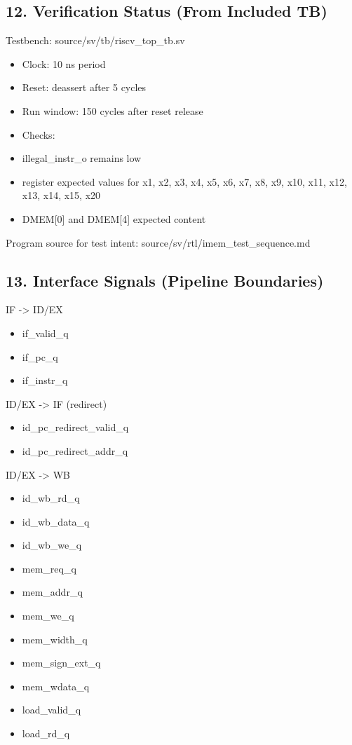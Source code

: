 \documentclass[]{article}
\providecommand{\tightlist}{%
  \setlength{\itemsep}{0pt}\setlength{\parskip}{0pt}}
\begin{document}
\hypertarget{12-verification-status-from-included-tb}{%
\subsection{12. Verification Status (From Included
TB)}\label{12-verification-status-from-included-tb}}

Testbench: source/sv/tb/riscv\_top\_tb.sv

\begin{itemize}
\tightlist
\item
  Clock: 10 ns period
\item
  Reset: deassert after 5 cycles
\item
  Run window: 150 cycles after reset release
\item
  Checks:
\item
  illegal\_instr\_o remains low
\item
  register expected values for x1, x2, x3, x4, x5, x6, x7, x8, x9, x10,
  x11, x12, x13, x14, x15, x20
\item
  DMEM{[}0{]} and DMEM{[}4{]} expected content
\end{itemize}

Program source for test intent: source/sv/rtl/imem\_test\_sequence.md

\hypertarget{13-interface-signals-pipeline-boundaries}{%
\subsection{13. Interface Signals (Pipeline
Boundaries)}\label{13-interface-signals-pipeline-boundaries}}

IF -\textgreater{} ID/EX

\begin{itemize}
\tightlist
\item
  if\_valid\_q
\item
  if\_pc\_q
\item
  if\_instr\_q
\end{itemize}

ID/EX -\textgreater{} IF (redirect)

\begin{itemize}
\tightlist
\item
  id\_pc\_redirect\_valid\_q
\item
  id\_pc\_redirect\_addr\_q
\end{itemize}

ID/EX -\textgreater{} WB

\begin{itemize}
\tightlist
\item
  id\_wb\_rd\_q
\item
  id\_wb\_data\_q
\item
  id\_wb\_we\_q
\item
  mem\_req\_q
\item
  mem\_addr\_q
\item
  mem\_we\_q
\item
  mem\_width\_q
\item
  mem\_sign\_ext\_q
\item
  mem\_wdata\_q
\item
  load\_valid\_q
\item
  load\_rd\_q
\end{itemize}
\end{document}
